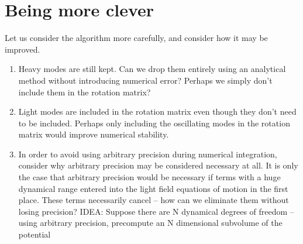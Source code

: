 \documentclass{article}
\begin{document}
\section{Being more clever}
Let us consider the algorithm more carefully, and consider how it may be improved.
\begin{enumerate}
    \item Heavy modes are still kept. Can we drop them entirely using an analytical method without introducing numerical error? Perhaps we simply don't include them in the rotation matrix?
    \item Light modes are included in the rotation matrix even though they don't need to be included. Perhaps only including the oscillating modes in the rotation matrix would improve numerical stability.
    \item In order to avoid using arbitrary precision during numerical integration, consider why arbitrary precision may be considered necessary at all. It is only the case that arbitrary precision would be necessary if terms with a huge dynamical range entered into the light field equations of motion in the first place. These terms necessarily cancel -- how can we eliminate them without losing precision? IDEA: Suppose there are N dynamical degrees of freedom -- using arbitrary precision, precompute an N dimensional subvolume of the potential
\end{enumerate}


\end{document}
